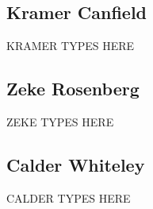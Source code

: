 \documentclass[12pt]{article}
\begin{document}
\subsection{Kramer Canfield}
\begin{changemargin}{1cm}{0cm} 
KRAMER TYPES HERE
\end{changemargin} 
\subsection{Zeke Rosenberg}
\begin{changemargin}{1cm}{0cm} 
ZEKE TYPES HERE
\end{changemargin} 
\subsection{Calder Whiteley}
\begin{changemargin}{1cm}{0cm} 
CALDER TYPES HERE
\end{changemargin} 
\end{document}
